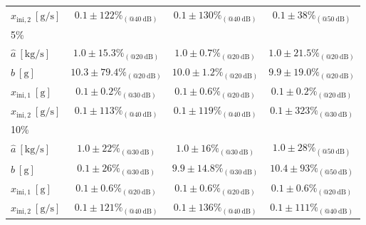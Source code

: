 \begin{table}[h!]
\begin{tabular}{c| c c c}
 \multicolumn{1}{l|}{\hspace{2mm} $\widehat{x}_{\mathrm{ini,2}} \ \mathrm{[g/s]}$} & $0.1 \pm 122 \%_{(@40 \ \mathrm{dB})}$ & $0.1 \pm 130 \%_{(@40 \ \mathrm{dB})}$ & $0.1 \pm 38 \%_{(@50 \ \mathrm{dB})}$ \\
 \multicolumn{1}{l|}{5\%} \\
 \multicolumn{1}{l|}{\hspace{2mm} $\widehat{a} \ \mathrm{[kg/s]}$} & $1.0 \pm 15.3 \%_{(@20 \ \mathrm{dB})}$ & $1.0 \pm 0.7 \%_{(@20 \ \mathrm{dB})}$ & $1.0 \pm 21.5 \%_{(@20 \ \mathrm{dB})}$ \\  
 \multicolumn{1}{l|}{\hspace{2mm} $\widehat{b} \ \mathrm{[g]}$} & $10.3 \pm 79.4 \%_{(@20 \ \mathrm{dB})}$ & $10.0 \pm 1.2 \%_{(@20 \ \mathrm{dB})}$ & $9.9 \pm 19.0 \%_{(@20 \ \mathrm{dB})}$ \\ 
\multicolumn{1}{l|}{\hspace{2mm} $\widehat{x}_{\mathrm{ini,1}} \ \mathrm{[g]}$} & $0.1 \pm 0.2 \%_{(@30 \ \mathrm{dB})}$ & $0.1 \pm 0.6 \%_{(@20 \ \mathrm{dB})}$ & $0.1 \pm 0.2 \%_{(@20 \ \mathrm{dB})}$ \\
 \multicolumn{1}{l|}{\hspace{2mm} $\widehat{x}_{\mathrm{ini,2}} \ \mathrm{[g/s]}$} & $0.1 \pm 113 \%_{(@40 \ \mathrm{dB})}$ & $0.1 \pm 119 \%_{(@40 \ \mathrm{dB})}$ & $0.1 \pm 323 \%_{(@30 \ \mathrm{dB})}$ \\
 \multicolumn{1}{l|}{10\%} \\
 \multicolumn{1}{l|}{\hspace{2mm} $\widehat{a} \ \mathrm{[kg/s]}$} & $1.0 \pm 22 \%_{(@30 \ \mathrm{dB})}$ & $1.0 \pm 16 \%_{(@30 \ \mathrm{dB})}$ & $1.0 \pm 28 \%_{(@50 \ \mathrm{dB})}$ \\ 
 \multicolumn{1}{l|}{\hspace{2mm} $\widehat{b} \ \mathrm{[g]}$} & $0.1 \pm 26 \%_{(@30 \ \mathrm{dB})}$ & $9.9 \pm 14.8 \%_{(@30 \ \mathrm{dB})}$ & $10.4 \pm 93 \%_{(@50 \ \mathrm{dB})}$ \\ 
\multicolumn{1}{l|}{\hspace{2mm} $\widehat{x}_{\mathrm{ini,1}} \ \mathrm{[g]}$} & $0.1 \pm 0.6 \%_{(@20 \ \mathrm{dB})}$ & $0.1 \pm 0.6 \%_{(@20 \ \mathrm{dB})}$ & $0.1 \pm 0.6 \%_{(@20 \ \mathrm{dB})}$ \\
 \multicolumn{1}{l|}{\hspace{2mm} $\widehat{x}_{\mathrm{ini,2}} \ \mathrm{[g/s]}$} & $0.1 \pm 121 \%_{(@40 \ \mathrm{dB})}$ & $0.1 \pm 136 \%_{(@40 \ \mathrm{dB})}$ & $0.1 \pm 111 \%_{(@40 \ \mathrm{dB})}$ \\  [0.5ex] 
\hline
\end{tabular}

\label{table:ml_sensitivity}
\end{table}




